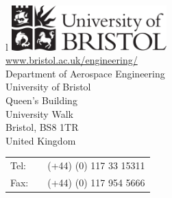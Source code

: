 \pagestyle{empty}
\vspace*{17.5cm}
\begin{minipage}[b]{14cm}
          \begin{tabular}{l}
          \includegraphics[width=6.0cm]{UoB-logo-black.pdf}\\
            \Large{\url{www.bristol.ac.uk/engineering/}}\\
                \large Department of Aerospace Engineering \\
                \large University of Bristol\\
                \large Queen's Building \\
                \large University Walk\\
                \large Bristol, BS8 1TR \\
                \large United Kingdom\\
            \hspace*{-0.2cm}\large \begin{tabular}{l l l}
               Tel:& \quad   &(+44) (0) 117 33 15311\\
               Fax:& \quad   &(+44) (0) 117 954 5666\\
            \end{tabular}\\         
            \\
            \\
          \end{tabular}
        \end{minipage}
\restoregeometry
